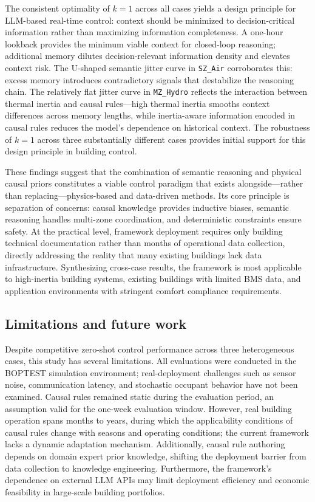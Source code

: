 \documentclass[a4paper]{cas-sc}
\begin{document}
The consistent optimality of $k=1$ across all cases yields a design principle for LLM-based real-time control: context should be minimized to decision-critical information rather than maximizing information completeness. A one-hour lookback provides the minimum viable context for closed-loop reasoning; additional memory dilutes decision-relevant information density and elevates context risk. The U-shaped semantic jitter curve in \texttt{SZ\_Air} corroborates this: excess memory introduces contradictory signals that destabilize the reasoning chain. The relatively flat jitter curve in \texttt{MZ\_Hydro} reflects the interaction between thermal inertia and causal rules---high thermal inertia smooths context differences across memory lengths, while inertia-aware information encoded in causal rules reduces the model's dependence on historical context. The robustness of $k=1$ across three substantially different cases provides initial support for this design principle in building control.

These findings suggest that the combination of semantic reasoning and physical causal priors constitutes a viable control paradigm that exists alongside---rather than replacing---physics-based and data-driven methods. Its core principle is separation of concerns: causal knowledge provides inductive biases, semantic reasoning handles multi-zone coordination, and deterministic constraints ensure safety. At the practical level, framework deployment requires only building technical documentation rather than months of operational data collection, directly addressing the reality that many existing buildings lack data infrastructure. Synthesizing cross-case results, the framework is most applicable to high-inertia building systems, existing buildings with limited BMS data, and application environments with stringent comfort compliance requirements.

\subsection{Limitations and future work}

Despite competitive zero-shot control performance across three heterogeneous cases, this study has several limitations. All evaluations were conducted in the BOPTEST simulation environment; real-deployment challenges such as sensor noise, communication latency, and stochastic occupant behavior have not been examined. Causal rules remained static during the evaluation period, an assumption valid for the one-week evaluation window. However, real building operation spans months to years, during which the applicability conditions of causal rules change with seasons and operating conditions; the current framework lacks a dynamic adaptation mechanism. Additionally, causal rule authoring depends on domain expert prior knowledge, shifting the deployment barrier from data collection to knowledge engineering. Furthermore, the framework's dependence on external LLM APIs may limit deployment efficiency and economic feasibility in large-scale building portfolios.
\end{document}
